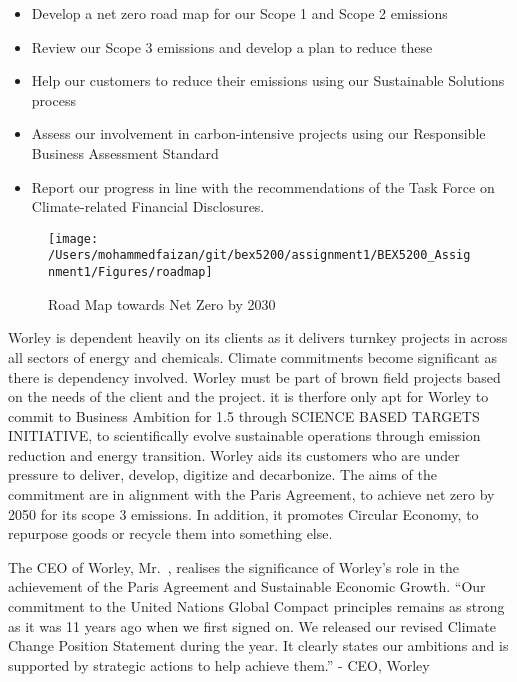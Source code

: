 \documentclass[11pt,a4paper,]{article}
\providecommand{\tightlist}{%
  \setlength{\itemsep}{0pt}\setlength{\parskip}{0pt}}
\begin{document}
\begin{itemize}
\tightlist
\item
  Develop a net zero road map for our Scope 1 and Scope 2 emissions
\item
  Review our Scope 3 emissions and develop a plan to reduce these
\item
  Help our customers to reduce their emissions using our Sustainable Solutions process
\item
  Assess our involvement in carbon-intensive projects using our Responsible Business Assessment Standard
\item
  Report our progress in line with the recommendations of the Task Force on Climate-related Financial Disclosures.
\end{itemize}

\begin{figure}

{\centering \texttt{[image: /Users/mohammedfaizan/git/bex5200/assignment1/BEX5200\_Assignment1/Figures/roadmap]} 

}

\caption{Road Map towards Net Zero by 2030}\label{fig:roadmap}
\end{figure}

Worley is dependent heavily on its clients as it delivers turnkey projects in across all sectors of energy and chemicals. Climate commitments become significant as there is dependency involved. Worley must be part of brown field projects based on the needs of the client and the project. it is therfore only apt for Worley to commit to Business Ambition for 1.5 through SCIENCE BASED TARGETS INITIATIVE, to scientifically evolve sustainable operations through emission reduction and energy transition. Worley aids its customers who are under pressure to deliver, develop, digitize and decarbonize. The aims of the commitment are in alignment with the Paris Agreement, to achieve net zero by 2050 for its scope 3 emissions. In addition, it promotes Circular Economy, to repurpose goods or recycle them into something else.

The CEO of Worley, Mr.~, realises the significance of Worley's role in the achievement of the Paris Agreement and Sustainable Economic Growth.
``Our commitment to the United Nations Global Compact principles remains as strong as it was 11 years ago when we first signed on.
We released our revised Climate Change Position Statement during the year. It clearly states our ambitions and is supported by strategic actions to help achieve them.'' - CEO, Worley
\end{document}
